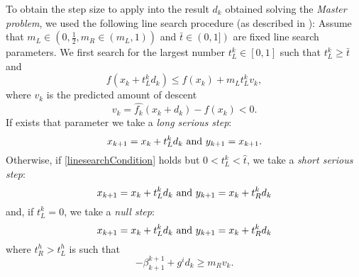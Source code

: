 To obtain the step size to apply into the result $d_{k}$ obtained solving the \textit{Master problem}, we used the following line search procedure (as described in \cite{NonsmoothOPT}): 
Assume that $m_{L} \in (0, \frac{1}{2}, m_{R} \in (m_{L},1))$ \textnormal{ and } $ \bar{t} \in (0,1])$ are fixed line search parameters. We first search for the largest number $t_{L}^k \in [0,1]$ such that $t_{L}^k \geq \bar{t}$ and
\begin{equation}
\label{linesearchCondition}
f(x_{k}+t_{L}^k d_{k}) \leq f(x_{k}) + m_{L}t_{L}^k v_{k}, 
\end{equation}
where $v_{k}$ is the predicted amount of descent 
\begin{equation}
v_{k} = \hat{f_{k}}(x_{k}+d_{k}) - f(x_{k}) < 0.
\end{equation}
If exists that parameter we take a \textit{long serious step}:
\begin{equation}
x_{k+1} = x_{k} + t_{L}^k d_{k} \textnormal{ and } y_{k+1}= x_{k+1}.
\end{equation}
Otherwise, if \ref{linesearchCondition} holds but $0 < t_{L}^k < \hat{t}$, we take a \textit{short serious step}:
\begin{equation}
x_{k+1} = x_{k} + t_{L}^k d_{k} \textnormal{ and } y_{k+1}= x_{k}+t_{R}^k d_{k}
\end{equation} 
and, if $t_ {L}^k=0$, we take a \textit{null step}: 
\begin{equation}
x_{k+1} = x_{k} + t_{L}^k d_{k} \textnormal{ and } y_{k+1}= x_{k}+t_{R}^k  d_{k}
\end{equation}
where $t_{R}^h > t_{L}^h$ is such that 
\begin{equation}
- \beta_{k+1}^{k+1}+ g^i d_{k} \geq m_{R}v_{k}.
\end{equation}
